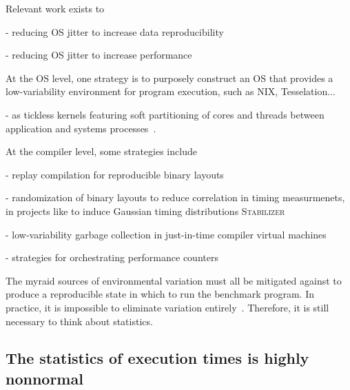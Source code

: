 \documentclass[conference]{IEEEtran}
\begin{document}
Relevant work exists to


- reducing OS jitter to increase data reproducibility

- reducing OS jitter to increase performance

At the OS level, one strategy is to purposely construct an OS that provides a
low-variability environment for program execution, such as NIX\cite{},
Tesselation...

- as tickless kernels featuring soft partitioning of cores and threads between application and systems processes~\cite{Akkan2012}.


At the compiler level, some strategies include

- replay compilation for reproducible binary layouts~\cite{Georges2008}

- randomization of binary layouts to reduce correlation in timing measurmenets,
in projects like  to induce Gaussian timing distributions
\textsc{Stabilizer}~\cite{Curtsinger2013}

- low-variability garbage collection in just-in-time compiler virtual machines~\cite{Huang2004}

- strategies for orchestrating performance counters

The myraid sources of environmental variation must all be mitigated against to
produce a reproducible state in which to run the benchmark program. In practice,
it is impossible to eliminate variation entirely~\cite{Alcocer2015,Barrett2016}.
Therefore, it is still necessary to think about statistics.


\subsection{The statistics of execution times is highly nonnormal}
\end{document}
